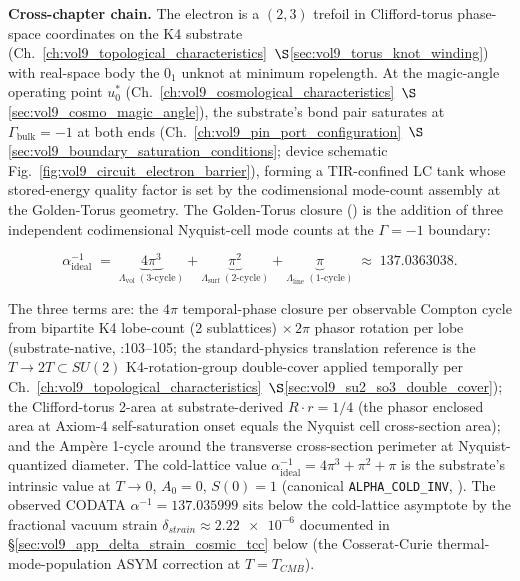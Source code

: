 \textbf{Cross-chapter chain.} The electron is a $(2,3)$ trefoil in Clifford-torus phase-space coordinates on the K4 substrate (Ch.~\ref{ch:vol9_topological_characteristics}~$\S$\ref{sec:vol9_torus_knot_winding}) with real-space body the $0_1$ unknot at minimum ropelength. At the magic-angle operating point $u_0^*$ (Ch.~\ref{ch:vol9_cosmological_characteristics}~$\S$\ref{sec:vol9_cosmo_magic_angle}), the substrate's bond pair saturates at $\Gamma_{\mathrm{bulk}} = -1$ at both ends (Ch.~\ref{ch:vol9_pin_port_configuration}~$\S$\ref{sec:vol9_boundary_saturation_conditions}; device schematic Fig.~\ref{fig:vol9_circuit_electron_barrier}), forming a TIR-confined LC tank whose stored-energy quality factor is set by the codimensional mode-count assembly at the Golden-Torus geometry. The Golden-Torus closure () is the addition of three independent codimensional Nyquist-cell mode counts at the $\Gamma = -1$\gammaundeclared{} boundary:

\[
\alpha^{-1}_{\text{ideal}} \;=\; \underbrace{4\pi^3}_{\Lambda_{\text{vol}}\;(3\text{-cycle})} + \underbrace{\pi^2}_{\Lambda_{\text{surf}}\;(2\text{-cycle})} + \underbrace{\pi}_{\Lambda_{\text{line}}\;(1\text{-cycle})} \;\approx\; 137.0363038.
\]

The three terms are: the $4\pi$ temporal-phase closure per observable Compton cycle from bipartite K4 lobe-count (2 sublattices) $\times\, 2\pi$ phasor rotation per lobe (substrate-native, :103--105; the standard-physics translation reference is the $T \to 2T \subset SU(2)$ K4-rotation-group double-cover applied temporally per Ch.~\ref{ch:vol9_topological_characteristics}~$\S$\ref{sec:vol9_su2_so3_double_cover}); the Clifford-torus 2-area at substrate-derived $R \cdot r = 1/4$ (the phasor enclosed area at Axiom-4 self-saturation onset equals the Nyquist cell cross-section area); and the Ampère 1-cycle around the transverse cross-section perimeter at Nyquist-quantized diameter. The cold-lattice value $\alpha^{-1}_{\text{ideal}} = 4\pi^3 + \pi^2 + \pi$ is the substrate's intrinsic value at $T \to 0$, $A_0 = 0$, $S(0) = 1$ (canonical \texttt{ALPHA\_COLD\_INV}, ). The observed CODATA $\alpha^{-1} = 137.035999$ sits below the cold-lattice asymptote by the fractional vacuum strain $\delta_{strain} \approx \num{2.22e-6}$ documented in \S\ref{sec:vol9_app_delta_strain_cosmic_tcc} below (the Cosserat-Curie thermal-mode-population ASYM correction at $T = T_{CMB}$).


